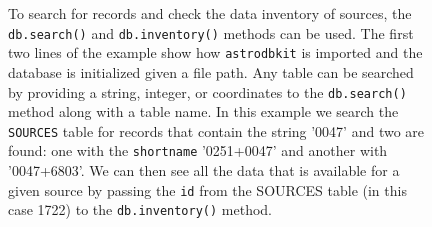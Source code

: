 \documentclass[iop,revtex4,natbib209]{emulateapj}
\begin{document}
\begin{figure}
\begin{center}
\caption{\label{fig:inventory}To search for records and check the data inventory of sources, the \texttt{db.search()} and \texttt{db.inventory()} methods can be used. The first two lines of the example show how \texttt{astrodbkit} is imported and the database is initialized given a file path. Any table can be searched by providing a string, integer, or coordinates to the \texttt{db.search()} method along with a table name. In this example we search the \texttt{SOURCES} table for records that contain the string '0047' and two are found: one with the \texttt{shortname} '0251+0047' and another with '0047+6803'. We can then see all the data that is available for a given source by passing the \texttt{id} from the SOURCES table (in this case 1722) to the \texttt{db.inventory()} method.}
\end{center}
\end{figure}





\end{document}
